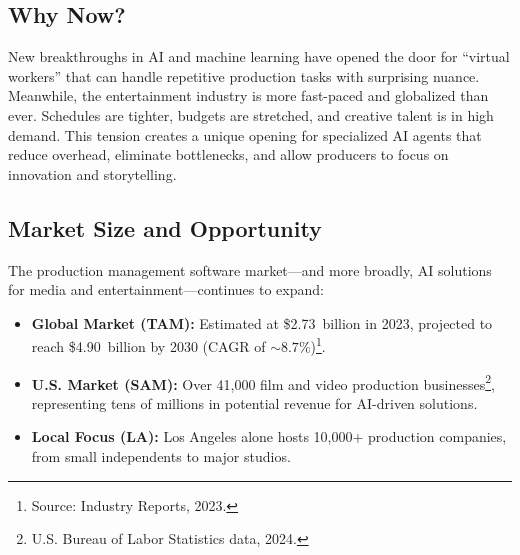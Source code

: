 \documentclass[11pt]{article}
\begin{document}
\subsection{Why Now?}
New breakthroughs in AI and machine learning have opened the door for “virtual workers” that can handle repetitive production tasks with surprising nuance. Meanwhile, the entertainment industry is more fast-paced and globalized than ever. Schedules are tighter, budgets are stretched, and creative talent is in high demand. This tension creates a unique opening for specialized AI agents that reduce overhead, eliminate bottlenecks, and allow producers to focus on innovation and storytelling.

\subsection{Market Size and Opportunity}
The production management software market—and more broadly, AI solutions for media and entertainment—continues to expand:
\begin{itemize}
    \item \textbf{Global Market (TAM):} Estimated at \$2.73~billion in 2023, projected to reach \$4.90~billion by 2030 (CAGR of $\sim8.7\%$)\footnote{Source: Industry Reports, 2023.}.
    \item \textbf{U.S. Market (SAM):} Over 41,000 film and video production businesses\footnote{U.S. Bureau of Labor Statistics data, 2024.}, representing tens of millions in potential revenue for AI-driven solutions.
    \item \textbf{Local Focus (LA):} Los Angeles alone hosts 10,000+ production companies, from small independents to major studios.
\end{itemize}

\begin{table}[H]
\centering
{}
\caption{Market Size Estimates}
\label{tab:market-size}
\end{table}
\end{document}

